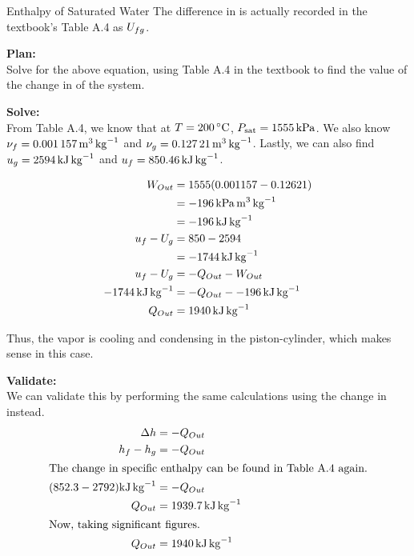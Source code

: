 \begin{example}{Enthalpy of Saturated Water}
  The difference in  is actually recorded in the textbook's Table A.4 as $U_{fg}$.

  \textbf{Plan:} \\
  Solve for the above equation, using Table A.4 in the textbook to find the value of the change in  of the system.

  \textbf{Solve:} \\
  From Table A.4, we know that at $\Temp = \SI{200}{\degreeCelsius}$, $P_{\mathrm{sat}} = \SI{1555}{\kilo\pascal}$.
  We also know $\nu_{f} = \SI{0.001157}{\meter\cubed\per\kilo\gram}$ and $\nu_{g} = \SI{0.12721}{\meter\cubed\per\kilo\gram}$.
  Lastly, we can also find $u_{g} = \SI{2594}{\kilo\joule\per\kilo\gram}$ and $u_{f} = \SI{850.46}{\kilo\joule\per\kilo\gram}$.

  \begin{align*}
    W_{Out} &= 1555 (0.001157 - 0.12621) \\
                &= \SI{-196}{\kilo\pascal\meter\cubed\per\kilo\gram} \\
                &= \SI{-196}{\kilo\joule\per\kilo\gram} \\
    u_{f} - U_{g} &= 850 - 2594 \\
                &= \SI{-1744}{\kilo\joule\per\kilo\gram} \\
    u_{f} - U_{g} &= -Q_{Out} - W_{Out} \\
    \SI{-1744}{\kilo\joule\per\kilo\gram} &= -Q_{Out} - \SI{-196}{\kilo\joule\per\kilo\gram} \\
    Q_{Out} &= \SI{1940}{\kilo\joule\per\kilo\gram}
  \end{align*}

  Thus, the vapor is cooling and condensing in the piston-cylinder, which makes sense in this case.

  \textbf{Validate:} \\
  We can validate this by performing the same calculations using the change in  instead.
  \begin{align*}
    \Delta h &= -Q_{Out} \\
    h_{f} - h_{g} &= -Q_{Out} \\
    \intertext{The change in specific enthalpy can be found in Table A.4 again.}
    (852.3 - 2792) \si{\kilo\joule\per\kilo\gram} &= -Q_{Out} \\
    Q_{Out} &= \SI{1939.7}{\kilo\joule\per\kilo\gram} \\
    \shortintertext{Now, taking significant figures.}
    Q_{Out} &= \SI{1940}{\kilo\joule\per\kilo\gram}
  \end{align*}


\end{example}
